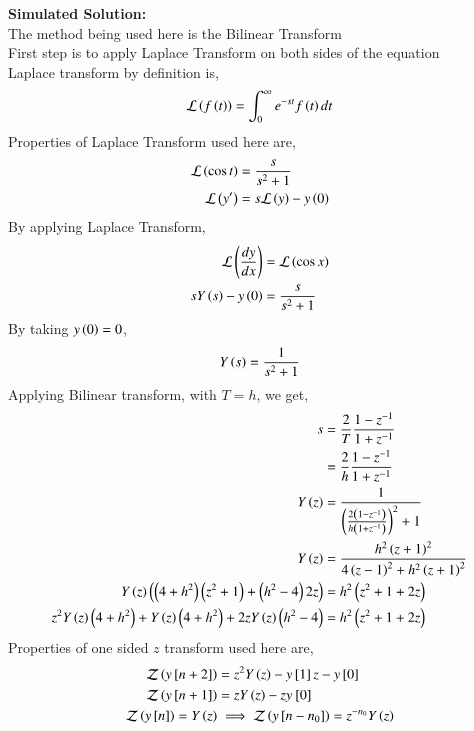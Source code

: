 \documentclass[journal]{IEEEtran}
\begin{document}
\textbf{Simulated Solution:}\\
The method being used here is the Bilinear Transform\\
First step is to apply Laplace Transform on both sides of the equation\\
Laplace transform by definition is,
\begin{align}
	\mathcal{L}\left(f\left(t\right)\right) = \int_0^{\infty} e^{-st} f\left(t\right) dt
\end{align}
Properties of Laplace Transform used here are,
\begin{align}
	\mathcal{L}\left(\cos{t}\right) &= \frac{s}{s^2 + 1}\\
	\mathcal{L}\left(y^\prime\right) &= s\mathcal{L}\left(y\right) - y\left(0\right)\\
\end{align}
By applying Laplace Transform,
\begin{align}
	\mathcal{L}\left(\frac{dy}{dx}\right) &= \mathcal{L}\left(\cos x\right)\\
	sY\left(s\right) - y\left(0\right) &= \frac{s}{s^2 + 1}\\
\end{align}
By taking $y\left(0\right) = 0$,
\begin{align}
	Y\left(s\right) = \frac{1}{s^2 + 1}
\end{align}
Applying Bilinear transform, with $T = h$, we get,
\begin{align}
	s &= \frac{2}{T}\frac{1 - z^{-1}}{1 + z^{-1}}\\
	&= \frac{2}{h}\frac{1 - z^{-1}}{1 + z^{-1}}\\
	Y\left(z\right) &= \frac{1}{\left(\frac{2\left(1 - z^{-1}\right)}{h \left(1 + z^{-1}\right)}\right)^2 + 1}\\
	Y\left(z\right) &= \frac{h^2\left(z + 1\right)^2}{4\left(z - 1\right)^2 + h^2\left(z + 1\right)^2}\\
	Y\left(z\right)\left(\left(4 + h^2\right)\left(z^2 + 1\right) + \left(h^2 - 4\right)2z\right) &= h^2\left(z^2 + 1 + 2z\right)\\
	z^2 Y\left(z\right)\left(4 + h^2\right) + Y\left(z\right)\left(4 + h^2\right) + 2z Y\left(z\right)\left(h^2 - 4\right) &= h^2\left(z^2 + 1 + 2z\right)\\
\end{align}
Properties of one sided $z$ transform used here are,
\begin{align}
	\mathcal{Z}\brak{y\sbrak{n + 2}} &= z^2 Y\brak{z} - y\sbrak{1}z - y\sbrak{0}\\
    	\mathcal{Z}\brak{y\sbrak{n + 1}} &= z Y\brak{z} - z y_\sbrak{0}\\
    	\mathcal{Z}\brak{y\sbrak{n}} = Y\brak{z} &\implies \mathcal{Z}\brak{y\sbrak{n - n_0}} = z^{-n_0}Y\brak{z} \label{time_shift_eq}
\end{align}
\end{document}
